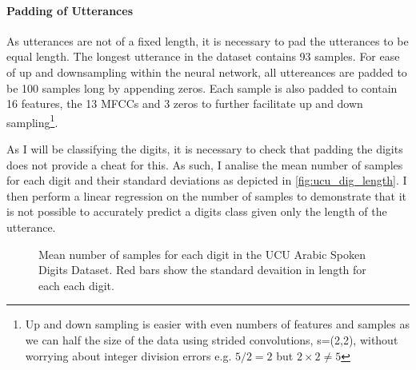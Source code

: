 \paragraph{Padding of Utterances}
As utterances are not of a fixed length, it is necessary to pad the utterances to be equal length. The longest utterance in the dataset contains 93 samples. For ease of up and downsampling within the neural network, all uttereances are padded to be 100 samples long by appending zeros. Each sample is also padded to contain 16 features, the 13 MFCCs and 3 zeros to further facilitate up and down sampling\footnote{Up and down sampling is easier with even numbers of features and samples as we can half the size of the data using strided convolutions, s=(2,2), without worrying about integer division errors e.g. $5/2=2$ but $2\times2 \neq5$}.

As I will be classifying the digits, it is necessary to check that padding the digits does not provide a cheat for this. As such, I analise the mean number of samples for each digit and their standard deviations as depicted in \autoref{fig:ucu_dig_length}. I then perform a linear regression on the number of samples to demonstrate that it is not possible to accurately predict a digits class given only the length of the utterance.

\begin{figure}
\centering
{}

	\caption{Mean number of samples for each digit in the UCU Arabic Spoken Digits Dataset. Red bars show the standard devaition in length for each each digit.}
	\label{fig:ucu_dig_length}

\end{figure}

